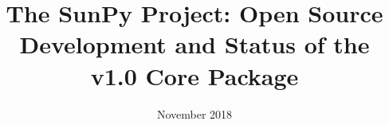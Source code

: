 \documentclass{aastex62}
\begin{document}
\title{The SunPy Project: Open Source Development and Status of the  v1.0 Core Package }


\date{November 2018}











\acknowledgments
{}



\end{document}
